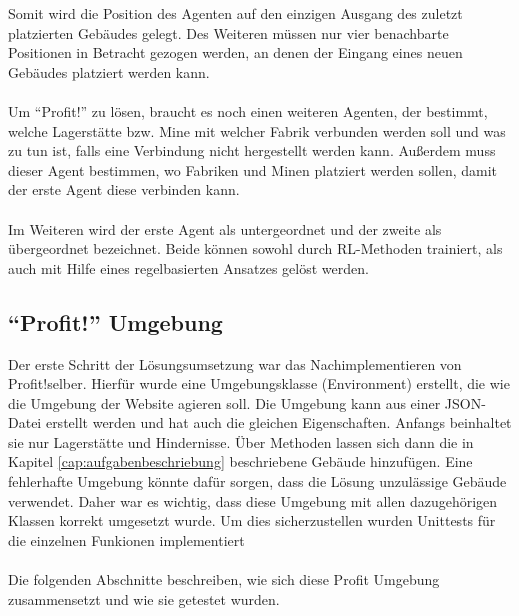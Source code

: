 Somit wird die Position des Agenten auf den einzigen Ausgang des zuletzt platzierten Gebäudes gelegt. Des Weiteren müssen nur vier benachbarte Positionen in Betracht gezogen werden, an denen der Eingang eines neuen Gebäudes platziert werden kann. 
\\\\
Um “Profit!” zu lösen, braucht es noch einen weiteren Agenten, der bestimmt, welche Lagerstätte bzw. Mine mit welcher Fabrik verbunden werden soll und was zu tun ist, falls eine Verbindung nicht hergestellt werden kann. Außerdem muss dieser Agent bestimmen, wo Fabriken und Minen platziert werden sollen, damit der erste Agent diese verbinden kann.
\\\\
Im Weiteren wird der erste Agent als untergeordnet und der zweite als übergeordnet bezeichnet. Beide können sowohl durch RL-Methoden trainiert, als auch mit Hilfe eines regelbasierten Ansatzes gelöst werden. 

\subsection{“Profit!” Umgebung}
Der erste Schritt der Lösungsumsetzung war das Nachimplementieren von \dq{}Profit!\dq selber.  Hierfür wurde eine Umgebungsklasse (Environment) erstellt, die wie die Umgebung der Website agieren soll. Die Umgebung kann aus einer JSON-Datei erstellt werden und hat auch die gleichen Eigenschaften. Anfangs beinhaltet sie nur Lagerstätte und Hindernisse. Über Methoden lassen sich dann die in Kapitel \ref{cap:aufgabenbeschriebung} beschriebene Gebäude hinzufügen.
Eine fehlerhafte Umgebung könnte dafür sorgen, dass die Lösung unzulässige Gebäude verwendet.
Daher war es wichtig, dass diese Umgebung mit allen dazugehörigen Klassen korrekt umgesetzt wurde. Um dies sicherzustellen wurden Unittests für die einzelnen Funkionen implementiert
\\\\
Die folgenden Abschnitte beschreiben, wie sich diese Profit Umgebung zusammensetzt und wie sie getestet wurden.

